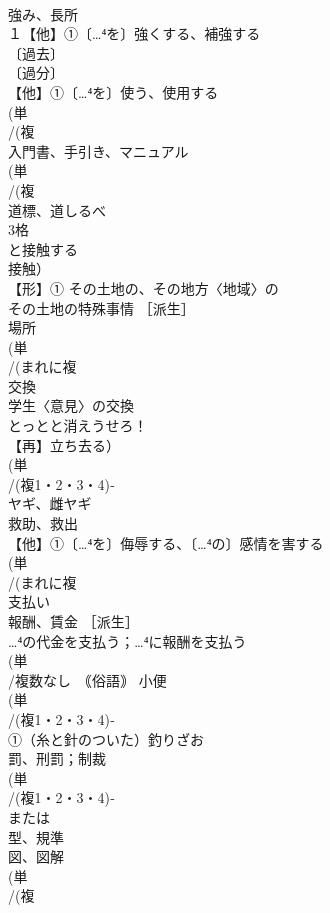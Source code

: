 \documentclass[8pt]{extreport}
\begin{document}
\begin{CJK}{UTF8}{min}
\\	強み、長所
\\	１【他】①〔…⁴を〕強くする、補強する 
\\	〔過去〕
\\	〔過分〕
\\	【他】①〔…⁴を〕使う、使用する 
\\	(単
\\	/(複
\\	入門書、手引き、マニュアル 
\\	(単
\\	/(複
\\	道標、道しるべ 
\\	3格 
\\	と接触する 
\\	接触）
\\	【形】① その土地の、その地方〈地域〉の 
\\	その土地の特殊事情 ［派生］ 
\\	場所
\\	(単
\\	/(まれに複
\\	交換 
\\	学生〈意見〉の交換
\\	とっとと消えうせろ！ 
\\	【再】立ち去る）
\\	(単
\\	/(複1・2・3・4)‐
\\	ヤギ、雌ヤギ 
\\	救助、救出 
\\	【他】①〔…⁴を〕侮辱する、〔…⁴の〕感情を害する 
\\	(単
\\	/(まれに複
\\	支払い 
\\	報酬、賃金 ［派生］ 
\\	…⁴の代金を支払う；…⁴に報酬を支払う
\\	(単
\\	/複数なし　｟俗語｠ 小便
\\	(単
\\	/(複1・2・3・4)‐
\\	①（糸と針のついた）釣りざお
\\	罰、刑罰；制裁 
\\	(単
\\	/(複1・2・3・4)‐
\\	または
\\	型、規準　
\\	図、図解
\\	(単
\\	/(複

\end{CJK}
\end{document}
